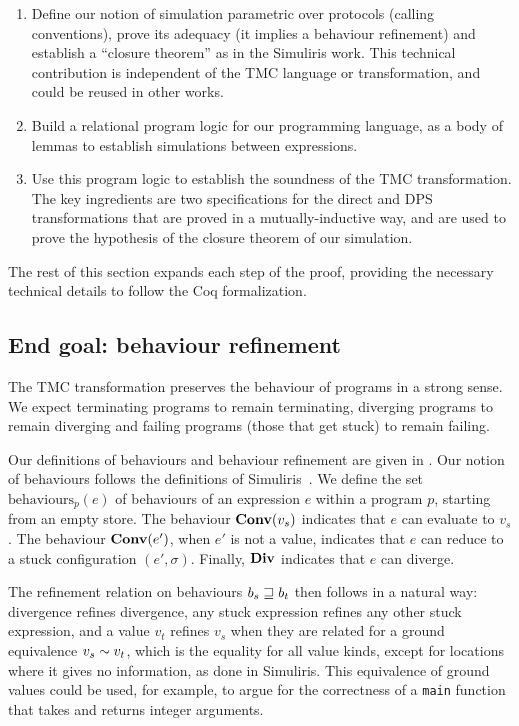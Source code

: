 \begin{enumerate}

\item Define our notion of simulation parametric over protocols (calling conventions), prove its adequacy (it implies a behaviour refinement) and establish a ``closure theorem'' as in the Simuliris work.
%
  This technical contribution is independent of the TMC language or transformation, and could be reused in other works.

\item Build a relational program logic for our programming language, as a body of lemmas to establish simulations between expressions.

\item Use this program logic to establish the soundness of the TMC transformation.
%
The key ingredients are two specifications for the direct and DPS transformations that are proved in a mutually-inductive way, and are used to prove the hypothesis of the closure theorem of our simulation.
\end{enumerate}

The rest of this section expands each step of the proof, providing the necessary technical details to follow the Coq formalization.

\subsection{End goal: behaviour refinement}

The TMC transformation preserves the behaviour of programs in a strong sense.
%
We expect terminating programs to remain terminating, diverging programs to remain diverging and failing programs (those that get stuck) to remain failing.

Our definitions of behaviours and behaviour refinement are given in .
%
Our notion of behaviours follows the definitions of Simuliris~\citep*{TODO-simuliris}.
%
We define the set $\mathrm{behaviours}_p(e)$ of behaviours of an expression $e$ within a program $p$, starting from an empty store.
%
The behaviour $\constr{Conv}(v_s)$ indicates that $e$ can evaluate to $v_s$.
%
The behaviour $\constr{Conv}(e')$, when $e'$ is not a value, indicates that $e$ can reduce to a stuck configuration $(e', \sigma)$.
%
Finally, $\constr{Div}$ indicates that $e$ can diverge.

The refinement relation on behaviours $b_s \sqsupseteq b_t$ then follows in a natural way: divergence refines divergence, any stuck expression refines any other stuck expression, and a value $v_t$ refines $v_s$ when they are related for a ground equivalence $v_s \sim v_t$, which is the equality for all value kinds, except for locations where it gives no information, as done in Simuliris.
%
This equivalence of ground values could be used, for example, to argue for the correctness of a \texttt{main} function that takes and returns integer arguments.


